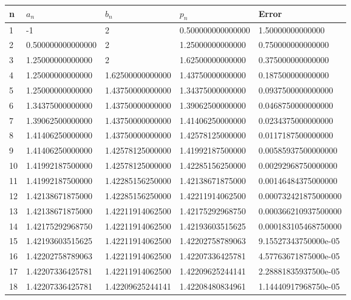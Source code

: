 \begin{solution}
\begin{enumerate}[label=(\alph*)]
\begin{table}[htb]
\begin{tabular}{@{}lllll@{}}
\toprule
n  & $a_n$             & $b_n$            & $p_n$             & Error                \\ \midrule
1  & -1                & 2                & 0.500000000000000 & 1.50000000000000     \\
2  & 0.500000000000000 & 2                & 1.25000000000000  & 0.750000000000000    \\
3  & 1.25000000000000  & 2                & 1.62500000000000  & 0.375000000000000    \\
4  & 1.25000000000000  & 1.62500000000000 & 1.43750000000000  & 0.187500000000000    \\
5  & 1.25000000000000  & 1.43750000000000 & 1.34375000000000  & 0.0937500000000000   \\
6  & 1.34375000000000  & 1.43750000000000 & 1.39062500000000  & 0.0468750000000000   \\
7  & 1.39062500000000  & 1.43750000000000 & 1.41406250000000  & 0.0234375000000000   \\
8  & 1.41406250000000  & 1.43750000000000 & 1.42578125000000  & 0.0117187500000000   \\
9  & 1.41406250000000  & 1.42578125000000 & 1.41992187500000  & 0.00585937500000000  \\
10 & 1.41992187500000  & 1.42578125000000 & 1.42285156250000  & 0.00292968750000000  \\
11 & 1.41992187500000  & 1.42285156250000 & 1.42138671875000  & 0.00146484375000000  \\
12 & 1.42138671875000  & 1.42285156250000 & 1.42211914062500  & 0.000732421875000000 \\
13 & 1.42138671875000  & 1.42211914062500 & 1.42175292968750  & 0.000366210937500000 \\
14 & 1.42175292968750  & 1.42211914062500 & 1.42193603515625  & 0.000183105468750000 \\
15 & 1.42193603515625  & 1.42211914062500 & 1.42202758789063  & 9.15527343750000e-05 \\
16 & 1.42202758789063  & 1.42211914062500 & 1.42207336425781  & 4.57763671875000e-05 \\
17 & 1.42207336425781  & 1.42211914062500 & 1.42209625244141  & 2.28881835937500e-05 \\
18 & 1.42207336425781  & 1.42209625244141 & 1.42208480834961  & 1.14440917968750e-05 \\

\end{tabular}
\end{table}
\end{enumerate}
\end{solution}
